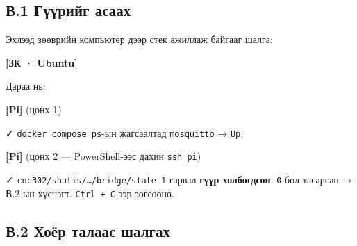 \hypertarget{ux432.1-ux433ux4afux4afux440ux438ux439ux433-ux430ux441ux430ux430ux445}{%
\subsection{В.1 Гүүрийг асаах}\label{ux432.1-ux433ux4afux4afux440ux438ux439ux433-ux430ux441ux430ux430ux445}}

Эхлээд зөөврийн компьютер дээр стек ажиллаж байгааг шалга:

\textbf{{[}ЗК · Ubuntu{]}}

\begin{Shaded}
\begin{Highlighting}[]
\KeywordTok{\&\&} \KeywordTok{\&\&} 
\end{Highlighting}
\end{Shaded}

Дараа нь:

\textbf{{[}Pi{]}} (цонх 1)

\begin{Shaded}
\begin{Highlighting}[]
\end{Highlighting}
\end{Shaded}

✓ \texttt{docker\ compose\ ps}-ын жагсаалтад \texttt{mosquitto} → \texttt{Up}.

\textbf{{[}Pi{]}} (цонх 2 --- PowerShell-ээс дахин \texttt{ssh\ pi})

\begin{Shaded}
\begin{Highlighting}[]
\end{Highlighting}
\end{Shaded}

✓ \texttt{cnc302/\allowbreak{}shutis/\allowbreak{}\ldots{}/\allowbreak{}bridge/\allowbreak{}state\ 1} гарвал \textbf{гүүр холбогдсон}. \texttt{0} бол тасарсан → В.2-ын хүснэгт. \texttt{Ctrl\ +\ C}-ээр зогсооно.

\hypertarget{ux432.2-ux445ux43eux451ux440-ux442ux430ux43bux430ux430ux441-ux448ux430ux43bux433ux430ux445}{%
\subsection{В.2 Хоёр талаас шалгах}\label{ux432.2-ux445ux43eux451ux440-ux442ux430ux43bux430ux430ux441-ux448ux430ux43bux433ux430ux445}}

